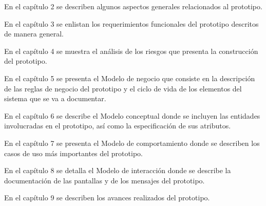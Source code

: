 \begin{Citemize}
	\item En el capítulo 2 se describen algunos aspectos generales relacionados al prototipo.
	\item En el capítulo 3 se enlistan los requerimientos funcionales del prototipo descritos de manera general.
	\item En el capítulo 4 se muestra el análisis de los riesgos que presenta la construcción del prototipo.
	\item En el capítulo 5 se presenta el Modelo de negocio que consiste en la descripción de las reglas de negocio del prototipo y el ciclo de vida de los elementos del sistema que se va a documentar.
	\item En el capítulo 6 se describe el Modelo conceptual donde se incluyen las entidades involucradas en el prototipo, así como la especificación de sus atributos.
	\item En el capítulo 7 se presenta el Modelo de comportamiento donde se describen los casos de uso más importantes del prototipo.
	\item En el capítulo 8 se detalla el Modelo de interacción donde se describe la documentación de las pantallas y de los mensajes del prototipo.
	\item En el capítulo 9 se describen los avances realizados del prototipo.
	
\end{Citemize}


